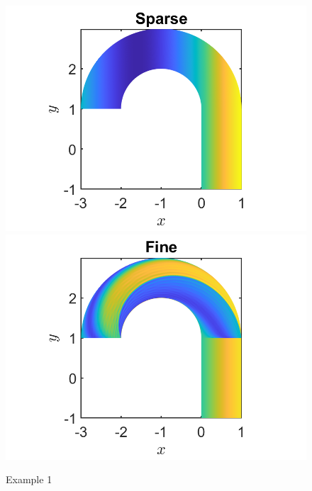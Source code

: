 \documentclass[11pt, a4paper]{article}
\theoremstyle{definition}
\begin{document}
\begin{figure}[h]
	\centering
	\includegraphics[scale=0.3]{Ex1a.png}
	\includegraphics[scale=0.3]{Ex1b.png}
	\caption{Example 1} 
	\label{F1}
\end{figure} 	
\end{document}
